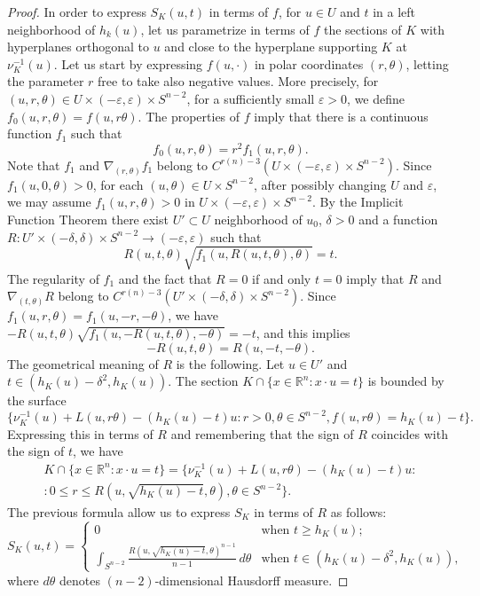 \documentclass[a4paper]{amsart}
\theoremstyle{definition}
\numberwithin{equation}{section}
\begin{document}
\begin{proof}
In order to express $S_K(u,t)$ in terms of $f$, for $u\in U$ and $t$ in a left neighborhood of $h_k(u)$, let us parametrize in terms of $f$ the sections of $K$ with  hyperplanes orthogonal to $u$ and close  to the hyperplane  supporting $K$ at $\nu_K^{-1}(u)$.
Let us start by expressing $f(u,\cdot)$ in polar coordinates $(r,{{\theta}})$, letting the parameter $r$ free to take also negative values. More precisely, for $(u,r,{{\theta}})\in U\times(-{{\varepsilon}},{{\varepsilon}})\times {S^{n-2}}$, for a sufficiently small ${{\varepsilon}}>0$, we define $f_0(u,r,{{\theta}})=f(u,r{{\theta}})$.
The properties of $f$ imply that there is a continuous function $f_1$ such that
\[
f_0(u,r,{{\theta}})=r^2f_1(u,r,{{\theta}}).
\]
Note that $f_1$ and $\nabla_{(r,{{\theta}})}f_1$ belong to $C^{{{r(n)}}-3}\left(U\times(-{{\varepsilon}},{{\varepsilon}})\times{S^{n-2}}\right)$.
Since $f_1(u,0,{{\theta}})>0$, for each $(u,{{\theta}})\in U\times {S^{n-2}}$, after possibly changing $U$ and ${{\varepsilon}}$, we may assume $f_1(u,r,{{\theta}})>0$ in $U\times(-{{\varepsilon}},{{\varepsilon}})\times{S^{n-2}}$.
By the Implicit Function Theorem there exist $U'\subset U$ neighborhood of $u_0$, ${{\delta}}>0$ and a function $R:U'\times (-{{\delta}},{{\delta}})\times{S^{n-2}}\to(-{{\varepsilon}},{{\varepsilon}})$ such that
\[
 R(u,t,{{\theta}})\sqrt{f_1\left(u,R(u,t,{{\theta}}),{{\theta}}\right)}=t.
\]
The regularity of $f_1$ and the fact that $R=0$ if and only $t=0$ imply that $R$ and $\nabla _{(t,{{\theta}})}R$ belong to $C^{{{r(n)}}-3}\left(U'\times(-{{\delta}},{{\delta}})\times{S^{n-2}}\right)$.  Since $f_1(u,r,{{\theta}})=f_1(u,-r,-{{\theta}})$, we have
$-R(u,t,{{\theta}})\sqrt{f_1\left(u,-R(u,t,{{\theta}}),-{{\theta}}\right)}=-t$, and this implies
\begin{equation}\label{lem_kobayashi_cm_a}
-R(u,t,{{\theta}})=R(u,-t,-{{\theta}}).
\end{equation}
The geometrical meaning of $R$ is the following.
Let $u\in U'$ and $t\in(h_K(u)-{{\delta}}^2,h_K(u))$. The section $K\cap\{x\in{\mathbb{R}}^n : x\cdot u=t\}$ is bounded by the surface
\[
 \Big\{ \nu^{-1}_K(u)+L(u,r{{\theta}})-\left(h_K(u)-t\right) u :
 r>0, {{\theta}}\in{S^{n-2}},  f(u,r\theta)=h_K(u)-t\Big\}.
\]
Expressing this in terms of $R$ and remembering that the sign of $R$ coincides with the sign of $t$, we have
\begin{multline*}
 K\cap\{x\in{\mathbb{R}}^n : x\cdot u=t\}=
 \Big\{ \nu^{-1}_K(u)+L(u,r{{\theta}})-\left(h_K(u)-t\right) u : \\
 :0\leq r\leq R\left(u,\sqrt{h_K(u)-t},{{\theta}}\right), {{\theta}}\in{S^{n-2}}\Big\}.
\end{multline*}
The previous formula allow us to  express $S_K$ in terms of $R$ as follows:
\begin{equation*}
 S_K(u,t)=
\begin{cases}
           0&\text{when $t\geq h_K(u)$;}\\
	  \displaystyle \int_{S^{n-2}} \frac{R\left(u,\sqrt{h_K(u)-t},{{\theta}}\right)^{n-1}}{n-1}\,d{{\theta}}& \text{when $t\in(h_K(u)-{{\delta}}^2,h_K(u))$,}
\end{cases}
\end{equation*}
where $d{{\theta}}$ denotes $(n-2)$-dimensional Hausdorff measure. 


\end{proof}
\end{document}
